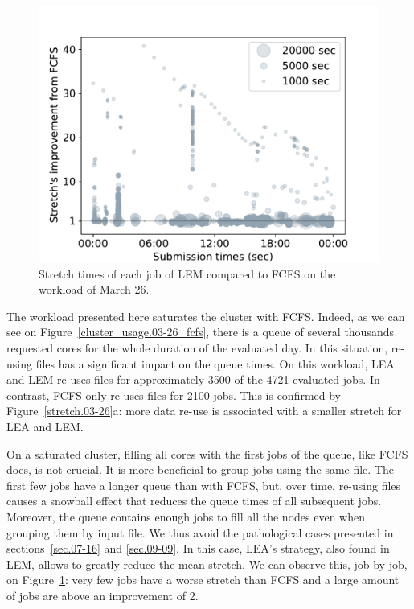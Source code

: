 \documentclass[sigconf,review,anonymous]{acmart}
\begin{document}
\begin{figure}[t]\centering\includegraphics[width=0.9\linewidth]{../MBSS/plot/Stretch_times/Stretch_times_FCFS_LEM_2022-03-26->2022-03-26_V10000_450_128_32_256_4_1024.pdf}\caption{Stretch times of each job of LEM compared to FCFS on the workload of March 26.}\label{vs_fcfs_lem_03-26}\end{figure}

The workload presented here saturates the cluster with FCFS. 
Indeed, as we can see on Figure~\ref{cluster_usage.03-26_fcfs}, there is
a queue of several thousands requested cores
for the whole duration of the evaluated day.
In this situation, re-using files has a significant impact
on the queue times. 
On this workload, LEA and LEM re-uses files for approximately 3500
of the 4721 evaluated jobs. In contrast, FCFS only re-uses files for 2100 jobs.
This is confirmed by Figure~\ref{stretch.03-26}a:
more data re-use is associated with a smaller stretch for LEA and LEM.

On a saturated cluster, filling all cores with the first jobs of the queue, like FCFS does, is not crucial.
It is more beneficial to group jobs using the same file.
The first few jobs have a longer queue than with FCFS,
but, over time, re-using files causes a snowball effect that reduces the 
queue times of all subsequent jobs.
Moreover, the queue contains enough jobs to fill all the nodes even when grouping them by input file.
We thus avoid the pathological cases presented in sections~\ref{sec.07-16} and \ref{sec.09-09}.
In this case, LEA's strategy, also found in LEM, allows to greatly reduce the mean stretch.
We can observe this, job by job, on Figure~\ref{vs_fcfs_lem_03-26}: very few jobs 
have a worse stretch than FCFS and a large amount of jobs are above an improvement of 2. 
\end{document}
